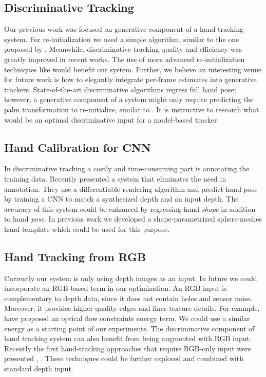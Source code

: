 \subsection*{Discriminative Tracking}
Our previous work was focused on generative component of a hand tracking system. For re-initialization we used a simple algorithm, similar to the one proposed by \cite{qian2014realtime}. Meanwhile, discriminative tracking quality and efficiency was greatly improved in recent works. 
The use of more advanced re-initialization techniques like \cite{oberweger2017deepprior++} would benefit our system. Further, we believe an interesting venue for future work is how to elegantly integrate per-frame estimates into generative trackers. State-of-the-art discriminative algorithms regress full hand pose; however, a generative component of a system might only require predicting the palm transformation to re-initialize, similar to \cite{taylor2017articulated}. It is instructive to research what would be an optimal discriminative input for a model-based tracker.

\subsection*{Hand Calibration for CNN}
In discriminative tracking a costly and time-consuming part is annotating the training data. Recently \cite{ dibra2017refine} presented a system that eliminates the need in annotation. They use a differentiable rendering algorithm and predict hand pose by training a CNN to match a synthesized depth and an input depth. The accuracy of this system could be enhanced by regressing hand \textit{shape} in addition to hand \textit{pose}. In previous work we developed a shape-parametrized sphere-meshes hand template which could be used for this purpose.

\subsection*{Hand Tracking from RGB}
Currently our system is only using depth images as an input. In future we could incorporate an RGB-based term in our optimization. An RGB input is complementary to depth data, since it does not contain holes and sensor noise. Moreover, it provides higher quality edges and finer texture details. For example, \cite{weise2011realtime} have proposed an optical flow constraints energy term. We could use a similar energy as a starting point of our experiments. The discriminative component of hand tracking system can also benefit from being augmented with RGB input. Recently the first hand-tracking approaches that require RGB-only input were presented \cite{simon2017hand}, \cite{zimmermann2017learning}. These techniques could be further explored and combined with standard depth input.

